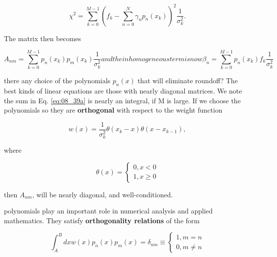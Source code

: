 \begin{equation}\label{eq:08_38}
\chi^{2} = \sum_{k=0}^{M-1} (f_{k} - \sum_{n=0}^{N} \gamma_{n}p_{n}(x_{k}) )^2 \frac{1}{\sigma_{k}^{2}} .
\end{equation}

The matrix then becomes

\begin{subequations}
    \begin{equation}
    A_{nm} = \sum_{k=0}^{M-1} p_{n}(x_{k})p_{m}(x_{k}) \frac{1}{\sigma_{k}^{2}}
    \end{equation}
and the inhomogeneous term is now
    \begin{equation}
    \beta_{n} = \sum_{k=0}^{M-1} p_{n}(x_{k})f_{k} \frac{1}{\sigma_{k}^{2}}
    \end{equation}
    \label{eq:08_39a}
\end{subequations}

 there any choice of the polynomials $p_{n}(x)$ that will eliminate roundoff? The best kinds of linear equations are those with nearly diagonal matrices. We note the sum in Eq. \ref{eq:08_39a} is nearly an integral, if M is large. If we choose the polynomials so they are \textbf{orthogonal} with respect to the weight function

\begin{equation*}
w(x) = \frac{1}{\sigma_{k}^{2}} \theta(x_{k} - x ) \theta(x - x_{k-1}),
\end{equation*}

where

\begin{equation*}
\theta(x) =
    \begin{cases}
        0, x < 0 \\
        1, x \geq 0
    \end{cases}
\end{equation*}

then $A_{nm}$, will be nearly diagonal, and well-conditioned.

 polynomials play an important role in numerical analysis and applied mathematics. They satisfy \textbf{orthogonality relations} of the form

\begin{equation}\label{eq:08_40}
\int_{A}^{B} dx w(x)p_{n}(x)p_{m}(x) = \delta_{nm} \equiv 
    \begin{cases}
        1, m   = n \\
        0, m \ne n 
    \end{cases}
\end{equation}

